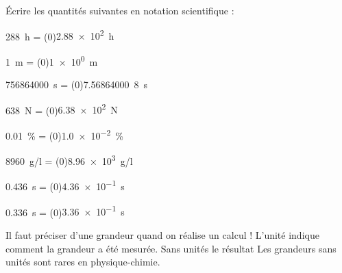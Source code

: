\numeroQuestion Écrire les quantités suivantes en notation scientifique :
\vspace*{-8pt}
\begin{listePoints}[2]
  \item \qty{288}{\hour}      = \texteTrou(0){\qty{2,88e2}{\hour}\\}
  \item \qty{1}{\m}           = \texteTrou(0){\qty{1e0}{\m}\\}
  \item \qty{756 864 000}{\s} = \texteTrou(0){\qty{7,56 864 000}{8\s}\\}
  \item \qty{638}{\newton}    = \texteTrou(0){\qty{6,38e2}{\newton}}
  \item \qty{0,01}{\percent}  = \texteTrou(0){\qty{1,0e-2}{\percent}\\}
  \item \qty{8960}{\g/\l}     = \texteTrou(0){\qty{8,96e3}{\g/\l}\\}
  \item \qty{0,436}{\s}       = \texteTrou(0){\qty{4,36e-1}{\s}\\}
  \item \qty{0,336}{\s}       = \texteTrou(0){\qty{3,36e-1}{\s}}
\end{listePoints}
\vspace*{-16pt}

\attention Il faut  préciser  d'une grandeur quand on réalise un calcul !
L'unité indique comment la grandeur a été mesurée.
Sans unités le résultat 
Les grandeurs sans unités sont rares en physique-chimie.



